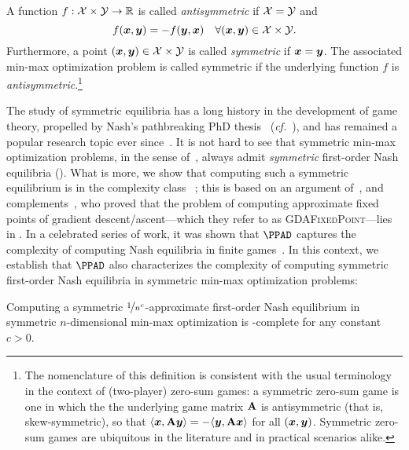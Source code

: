 \begin{definition}
    \label{def:symmetric}
  A function $f:\mathcal{X} \times \mathcal{Y} \to \mathbb{R}$ is called \emph{antisymmetric} if $\mathcal{X} = \mathcal{Y}$ and 
  \begin{equation*}
      f({\bm{x}},{\bm{y}}) = -f({\bm{y}},{\bm{x}}) \quad \forall ({\bm{x}}, {\bm{y}}) \in \mathcal{X} \times \mathcal{Y}.
  \end{equation*}
  Furthermore, a point $({\bm{x}}, {\bm{y}}) \in \mathcal{X} \times \mathcal{Y}$ is called \emph{symmetric} if ${\bm{x}} = {\bm{y}}$. The associated min-max optimization problem is called symmetric if the underlying function $f$ is \emph{antisymmetric}.\footnote{The nomenclature of this definition is consistent with the usual terminology in the context of (two-player) zero-sum games: a symmetric zero-sum game is one in which the the underlying game matrix $\mathbf{A}$ is antisymmetric (that is, skew-symmetric), so that $\langle {\bm{x}}, \mathbf{A} {\bm{y}} \rangle = - \langle {\bm{y}}, \mathbf{A} {\bm{x}} \rangle$ for all $({\bm{x}}, {\bm{y}})$. Symmetric zero-sum games are ubiquitous in the literature and in practical scenarios alike.}
\end{definition}
The study of symmetric equilibria has a long history in the development of game theory, propelled by Nash's pathbreaking PhD thesis~\citep{Nash50:Non} (\emph{cf.}~\citet{Gale51:Symmetric}), and has remained a popular research topic ever since~\citep{Tewolde25:Computing,Emmons22:For,Garg18:Existential,ghosh2024complexitysymmetricbimatrixgames,Mehta14:Constant}. It is not hard to see that symmetric min-max optimization problems, in the sense of~, always admit \emph{symmetric} first-order Nash equilibria (). What is more, we show that computing such a symmetric equilibrium is in the complexity class \PPAD~\citep{Papadimitriou94:Complexity}; this is based on an argument of~\citet{Etessami10:On}, and complements~\citet{DSZ21}, who proved that the problem of computing approximate fixed points of gradient descent/ascent---which they refer to as \textsc{GDAFixedPoint}---lies in \PPAD. In a celebrated series of work, it was shown that $\PPAD$ captures the complexity of computing Nash equilibria in finite games~\citep{Daskalakis09:The,Chen09:Settling}. In this context, we establish that $\PPAD$ also characterizes the complexity of computing symmetric first-order Nash equilibria in symmetric min-max optimization problems:

\begin{theorem}
    \label{theorem:main}
    Computing a symmetric $\nicefrac{1}{n^c}$-approximate first-order Nash equilibrium in symmetric $n$-dimensional min-max optimization is \PPAD-complete for any constant $c > 0$.
\end{theorem}

